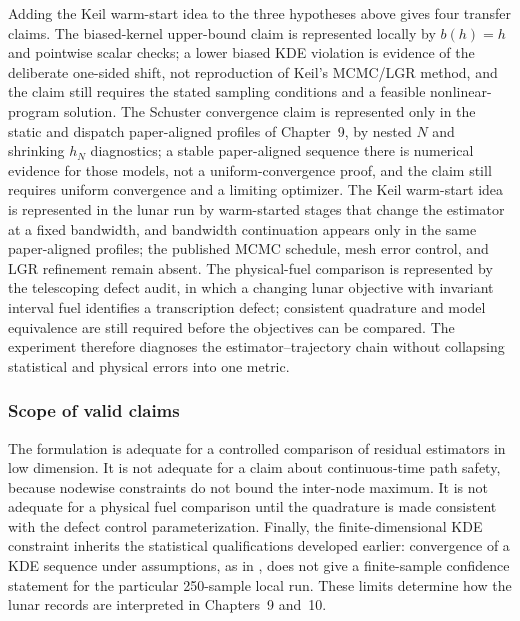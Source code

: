 Adding the Keil warm-start idea to the three hypotheses above gives four transfer claims. The biased-kernel upper-bound claim is represented locally by $b(h)=h$ and pointwise scalar checks; a lower biased KDE violation is evidence of the deliberate one-sided shift, not reproduction of Keil's MCMC/LGR method, and the claim still requires the stated sampling conditions and a feasible nonlinear-program solution. The Schuster convergence claim is represented only in the static and dispatch paper-aligned profiles of Chapter~9, by nested $N$ and shrinking $h_N$ diagnostics; a stable paper-aligned sequence there is numerical evidence for those models, not a uniform-convergence proof, and the claim still requires uniform convergence and a limiting optimizer. The Keil warm-start idea is represented in the lunar run by warm-started stages that change the estimator at a fixed bandwidth, and bandwidth continuation appears only in the same paper-aligned profiles; the published MCMC schedule, mesh error control, and LGR refinement remain absent. The physical-fuel comparison is represented by the telescoping defect audit, in which a changing lunar objective with invariant interval fuel identifies a transcription defect; consistent quadrature and model equivalence are still required before the objectives can be compared. The experiment therefore diagnoses the estimator--trajectory chain without collapsing statistical and physical errors into one metric.

\subsubsection{Scope of valid claims}

The formulation is adequate for a controlled comparison of residual estimators in low dimension. It is not adequate for a claim about continuous-time path safety, because nodewise constraints do not bound the inter-node maximum. It is not adequate for a physical fuel comparison until the quadrature is made consistent with the defect control parameterization. Finally, the finite-dimensional KDE constraint inherits the statistical qualifications developed earlier: convergence of a KDE sequence under assumptions, as in \citet{schuster2025}, does not give a finite-sample confidence statement for the particular 250-sample local run. These limits determine how the lunar records are interpreted in Chapters~9 and~10.
